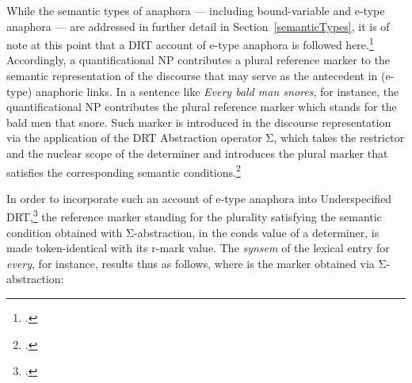 \documentclass[output=paper
,modfonts
,nonflat]{langsci/langscibook}
\begin{document}
\begin{paperappendix}
While the semantic types of anaphora --- including bound-variable and e-type anaphora --- are addressed in further detail in Section~\ref{semanticTypes},
it is of note at this point that a DRT account of e-type anaphora is followed here.\footnote{
\citep[\page 311ff]{kamp:drt93}.} 
Accordingly, a quantificational NP contributes a plural reference marker to the
semantic representation of the discourse that may serve as the antecedent in (e-type) 
anaphoric links. In a sentence like {\em Every bald man snores}, for instance,
the quantificational NP contributes 
the plural reference marker which stands for the bald
men that snore. Such marker is introduced in the discourse representation
via the application of the DRT Abstraction operator Σ, which
takes the restrictor and the nuclear scope of the determiner and
introduces the plural marker that satisfies the corresponding
semantic conditions.\footnote{
\citep[]{kamp:drt93}.}

In order to incorporate such an account of e-type anaphora
into Underspecified DRT,\footnote{
\citep{frank:sem95}.} 
the reference marker standing for the plurality
satisfying the semantic condition obtained with  
\mbox{Σ-abstraction}, in the {\sc conds} value of a determiner, 
is made token-identical with its {\sc r-mark} value. The {\em synsem} of the
lexical  entry for {\em every}, for instance, results thus as follows, where
 is the marker obtained
via 
\mbox{Σ-abstraction}:
% 
\\
\avmfont{\sc}
\avmvalfont{\it}
\avmsortfont{\it}
\begin{center}
\begin{avm}


\end{avm}
\end{center}
\end{paperappendix}
\end{document}
